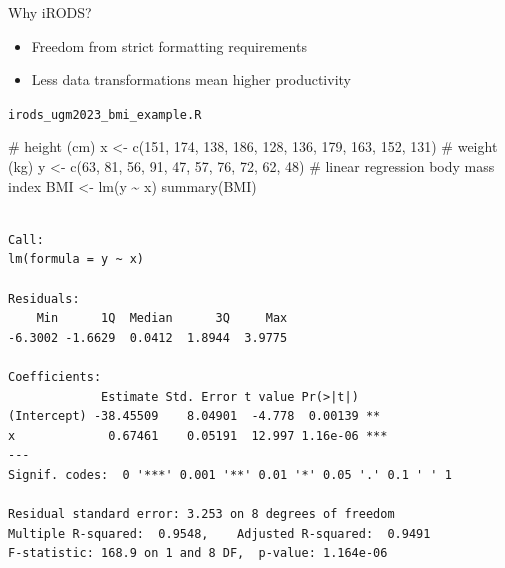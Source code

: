 \documentclass[
  ignorenonframetext,
]{beamer}
\newenvironment{Shaded}{\begin{snugshade}}{\end{snugshade}}
\newcommand{\CommentTok}[1]{\textcolor[rgb]{0.37,0.37,0.37}{#1}}
\newcommand{\DecValTok}[1]{\textcolor[rgb]{0.68,0.00,0.00}{#1}}
\newcommand{\FunctionTok}[1]{\textcolor[rgb]{0.28,0.35,0.67}{#1}}
\newcommand{\NormalTok}[1]{\textcolor[rgb]{0.00,0.23,0.31}{#1}}
\newcommand{\OtherTok}[1]{\textcolor[rgb]{0.00,0.23,0.31}{#1}}
\newcommand{\SpecialCharTok}[1]{\textcolor[rgb]{0.37,0.37,0.37}{#1}}
\providecommand{\tightlist}{%
  \setlength{\itemsep}{0pt}\setlength{\parskip}{0pt}}\usepackage{longtable,booktabs,array}
\begin{document}
\begin{frame}[fragile]{Why iRODS?}
\protect\hypertarget{why-irods}{}
\begin{itemize}
\tightlist
\item
  Freedom from strict formatting requirements
\item
  Less data transformations mean higher productivity
\end{itemize}

\begin{codelisting}

\caption{\texttt{irods_ugm2023_bmi_example.R}}

\begin{Shaded}
\begin{Highlighting}[]
\CommentTok{\# height (cm)}
\NormalTok{x }\OtherTok{\textless{}{-}} \FunctionTok{c}\NormalTok{(}\DecValTok{151}\NormalTok{, }\DecValTok{174}\NormalTok{, }\DecValTok{138}\NormalTok{, }\DecValTok{186}\NormalTok{, }\DecValTok{128}\NormalTok{, }\DecValTok{136}\NormalTok{, }\DecValTok{179}\NormalTok{, }\DecValTok{163}\NormalTok{, }\DecValTok{152}\NormalTok{, }\DecValTok{131}\NormalTok{)}
\CommentTok{\# weight (kg)}
\NormalTok{y }\OtherTok{\textless{}{-}} \FunctionTok{c}\NormalTok{(}\DecValTok{63}\NormalTok{, }\DecValTok{81}\NormalTok{, }\DecValTok{56}\NormalTok{, }\DecValTok{91}\NormalTok{, }\DecValTok{47}\NormalTok{, }\DecValTok{57}\NormalTok{, }\DecValTok{76}\NormalTok{, }\DecValTok{72}\NormalTok{, }\DecValTok{62}\NormalTok{, }\DecValTok{48}\NormalTok{)}
\CommentTok{\# linear regression body mass index}
\NormalTok{BMI }\OtherTok{\textless{}{-}} \FunctionTok{lm}\NormalTok{(y }\SpecialCharTok{\textasciitilde{}}\NormalTok{ x) }
\FunctionTok{summary}\NormalTok{(BMI)}
\end{Highlighting}
\end{Shaded}

\end{codelisting}

\begin{verbatim}

Call:
lm(formula = y ~ x)

Residuals:
    Min      1Q  Median      3Q     Max 
-6.3002 -1.6629  0.0412  1.8944  3.9775 

Coefficients:
             Estimate Std. Error t value Pr(>|t|)    
(Intercept) -38.45509    8.04901  -4.778  0.00139 ** 
x             0.67461    0.05191  12.997 1.16e-06 ***
---
Signif. codes:  0 '***' 0.001 '**' 0.01 '*' 0.05 '.' 0.1 ' ' 1

Residual standard error: 3.253 on 8 degrees of freedom
Multiple R-squared:  0.9548,    Adjusted R-squared:  0.9491 
F-statistic: 168.9 on 1 and 8 DF,  p-value: 1.164e-06
\end{verbatim}
\end{frame}
\end{document}
